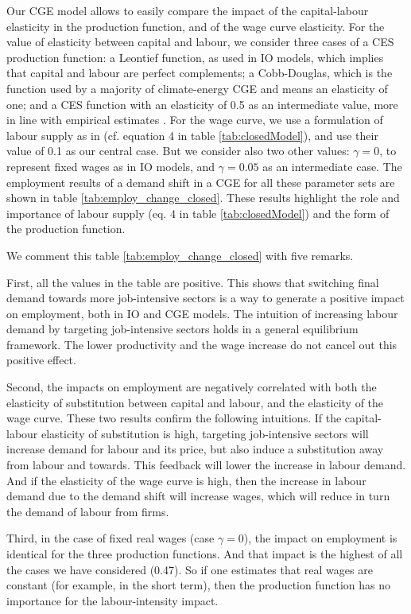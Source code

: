 Our CGE model allows to easily compare the impact of the capital-labour elasticity in the production function, and of the wage curve elasticity.
For the value of elasticity between capital and labour, we consider three cases of a CES production function: a Leontief function, as used in IO models, which implies that capital and labour are perfect complements; a Cobb-Douglas, which is the function used by a majority of climate-energy CGE \citep{VanderWerf2008} and means an elasticity of one; and a CES function with an elasticity of 0.5 as an intermediate value, more in line with empirical estimates \citep{VanderWerf2008, Antras2004}.
For the wage curve, we use a formulation of labour supply as in \citet{Blanchflower2005} (cf. equation 4 in table \ref{tab:closedModel}), and use their value of 0.1 as our central case. But we consider also two other values: $\gamma=0$, to represent fixed wages as in IO models, and $\gamma=0.05$ as an intermediate case.
The employment results of a demand shift in a CGE for all these parameter sets are shown in table \ref{tab:employ_change_closed}. These results highlight the role and importance of labour supply (eq. 4 in table \ref{tab:closedModel}) and the form of the production function. 

We comment this table \ref{tab:employ_change_closed} with five remarks.

First, all the values in the table are positive. This shows that switching final demand towards more job-intensive sectors is a way to generate a positive impact on employment, both in IO and CGE models. The intuition of increasing labour demand by targeting job-intensive sectors holds in a general equilibrium framework. The lower productivity and the wage increase do not cancel out this positive effect.

Second, the impacts on employment are negatively correlated with both the elasticity of substitution between capital and labour, and the elasticity of the wage curve. 
These two results confirm the following intuitions.
If the capital-labour  elasticity of substitution is high, targeting job-intensive sectors will increase demand for labour and its price, but also induce a substitution away from labour and towards. This feedback will lower the increase in labour demand. 
And if the elasticity of the wage curve is high, then the increase in labour demand due to the demand shift will increase wages, which will reduce in turn the demand of labour from firms.  

Third, in the case of fixed real wages (case $\gamma=0$), the impact on employment is identical for the three production functions. And that impact is the highest of all the cases we have considered (0.47). So if one estimates that real wages are constant (for example, in the short term), then the production function has no importance for the labour-intensity impact.

